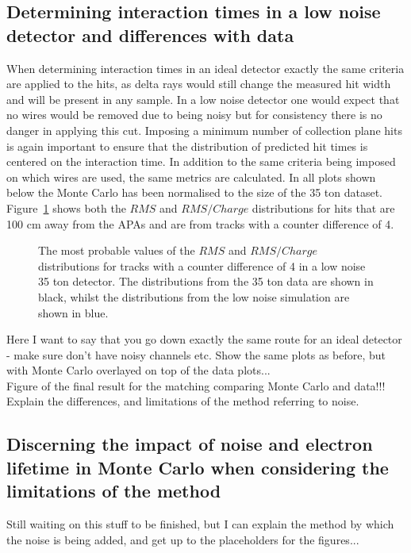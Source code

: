 \subsection{Determining interaction times in a low noise detector and differences with data}
When determining interaction times in an ideal detector exactly the same criteria are applied to the hits, as delta rays would still change the measured hit width and will be present in any sample. In a low noise detector one would expect that no wires would be removed due to being noisy but for consistency there is no danger in applying this cut. Imposing a minimum number of collection plane hits is again important to ensure that the distribution of predicted hit times is centered on the interaction time. In addition to the same criteria being imposed on which wires are used, the same metrics are calculated. In all plots shown below the Monte Carlo has been normalised to the size of the 35 ton dataset. \\

Figure~\ref{fig:DiffMCHitFit} shows both the $RMS$ and $RMS/Charge$ distributions for hits that are 100 cm away from the APAs and are from tracks with a counter difference of 4.  

\begin{figure}[h!]
  \centering
  \caption[The most probable values of the $RMS$ and $RMS/Charge$ distributions for tracks with a counter difference of 4 in a low noise 35 ton detector]
          {The most probable values of the $RMS$ and $RMS/Charge$ distributions for tracks with a counter difference of 4 in a low noise 35 ton detector. The distributions from the 35 ton data are shown in black, whilst the distributions from the low noise simulation are shown in blue.}
          \label{fig:DiffMCHitFit}
\end{figure}


Here I want to say that you go down exactly the same route for an ideal detector - make sure don't have noisy channels etc. Show the same plots as before, but with Monte Carlo overlayed on top of the data plots...\\

Figure of the final result for the matching comparing Monte Carlo and data!!!\\

Explain the differences, and limitations of the method referring to noise. 

\subsection{Discerning the impact of noise and electron lifetime in Monte Carlo when considering the limitations of the method} \label{sec:DiffMCStudies}
Still waiting on this stuff to be finished, but I can explain the method by which the noise is being added, and get up to the placeholders for the figures...
